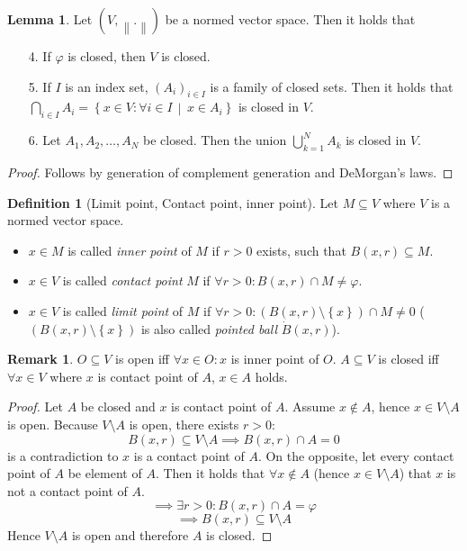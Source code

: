 \documentclass[a4paper,landscape,twocolumn]{article}
\theoremstyle{definition}
\newtheorem{defi}{Definition}
\newtheorem{rem}{Remark}
\newtheorem{lemma}{Lemma}
\newcommand\set[1]{\left\{#1\right\}}
\newcommand\setdef[2]{\left\{#1\,\middle|\,#2\right\}}
\newcommand\norm[1]{\left\|#1\right\|}
\begin{document}
\begin{lemma}
  Let $(V, \norm{.})$ be a normed vector space. Then it holds that
  \begin{itemize}
  \item[4.] If $\varphi$ is closed, then $V$ is closed.
  \item[5.] If $I$ is an index set, $(A_i)_{i \in I}$ is a family of closed sets.
    Then it holds that $\bigcap_{i \in I} A_i = \setdef{x \in V: \forall i \in I}{x \in A_i}$
    is closed in $V$.
  \item[6.] Let $A_1, A_2, \ldots, A_N$ be closed.
    Then the union $\bigcup_{k=1}^N A_k$ is closed in $V$.
  \end{itemize}
\end{lemma}
\begin{proof}
  Follows by generation of complement generation and DeMorgan's laws.
\end{proof}

\begin{defi}[Limit point, Contact point, inner point]
  Let $M \subseteq V$ where $V$ is a normed vector space.
  \begin{itemize}
  \item $x \in M$ is called \emph{inner point} of $M$ if $r > 0$ exists, such that $B(x, r) \subseteq M$.
  \item $x \in V$ is called \emph{contact point} $M$ if $\forall r > 0: B(x,r) \cap M \neq \varphi$.
  \item $x \in V$ is called \emph{limit point} of $M$ if $\forall r > 0: \left(B(x,r) \setminus \set{x}\right) \cap M \neq 0$
    ($\left(B(x,r) \setminus \set{x}\right)$ is also called \emph{pointed ball} $\dot{B}(x,r)$).
  \end{itemize}
\end{defi}

\begin{rem}
  $O \subseteq V$ is open iff $\forall x \in O: x$ is inner point of $O$.
  $A \subseteq V$ is closed iff $\forall x \in V$ where $x$ is contact point of $A$, $x \in A$ holds.
\end{rem}
\begin{proof}
  Let $A$ be closed and $x$ is contact point of $A$. Assume $x \not\in A$, hence $x \in V \setminus A$ is open.
  Because $V \setminus A$ is open, there exists $r > 0$:
  \[ B(x, r) \subseteq V \setminus A \implies B(x,r) \cap A = 0 \]
  is a contradiction to $x$ is a contact point of $A$.
  On the opposite, let every contact point of $A$ be element of $A$.
  Then it holds that $\forall x \not\in A$ (hence $x \in V \setminus A$)
  that $x$ is not a contact point of $A$.
  \[ \implies \exists r > 0: B(x, r) \cap A = \varphi \]
  \[ \implies B(x, r) \subseteq V \setminus A \]
  Hence $V \setminus A$ is open and therefore $A$ is closed.
\end{proof}
\end{document}
